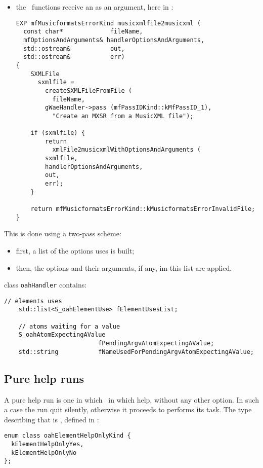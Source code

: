 {\begin{itemize}
\begin{lstlisting}[language=CPlusPlus]
  // ... ... ...
}
\end{lstlisting}

\item the \API\ functions receive an  as an argument, here in :
\begin{lstlisting}[language=CPlusPlus]
EXP mfMusicformatsErrorKind musicxmlfile2musicxml (
  const char*             fileName,
  mfOptionsAndArguments& handlerOptionsAndArguments,
  std::ostream&           out,
  std::ostream&           err)
{
	SXMLFile
	  sxmlfile =
	    createSXMLFileFromFile (
	      fileName,
	    gWaeHandler->pass (mfPassIDKind::kMfPassID_1),
	      "Create an MXSR from a MusicXML file");

	if (sxmlfile) {
		return
		  xmlFile2musicxmlWithOptionsAndArguments (
        sxmlfile,
        handlerOptionsAndArguments,
        out,
        err);
	}

	return mfMusicformatsErrorKind::kMusicformatsErrorInvalidFile;
}
\end{lstlisting}

\end{itemize}

This is done using a two-pass scheme:
\begin{itemize}
\item first, a list of the options uses is built;
\item then, the options and their arguments, if any, im this list are applied.
\end{itemize}

class   {\tt oahHandler} contains:
\begin{lstlisting}[language=CPlusPlus]
    // elements uses
    std::list<S_oahElementUse> fElementUsesList;

    // atoms waiting for a value
    S_oahAtomExpectingAValue
                          fPendingArgvAtomExpectingAValue;
    std::string           fNameUsedForPendingArgvAtomExpectingAValue;
\end{lstlisting}


	\subsection{Pure help runs}

A pure help run is one in which \mf\ in which help, without any other option. In such a case the run quit silently, otherwise it proceeds to performs its task. The type describing that is , defined in :
\begin{lstlisting}[language=CPlusPlus]
enum class oahElementHelpOnlyKind {
  kElementHelpOnlyYes,
  kElementHelpOnlyNo
};
\end{lstlisting}


}
